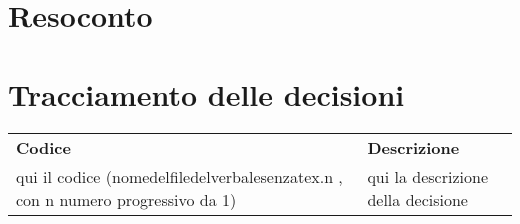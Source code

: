 \documentclass{article}
\begin{document}
\section{Resoconto}%
\label{resoconto}
\paragraph*{}

\section{Tracciamento delle decisioni}
\begin{table}[H]
  \centering
  \begin{tabular}{p{4cm}|p{12cm}}
    \rowcolor{lightgray}
    \textbf{Codice}  & \textbf{Descrizione}      \\
    qui il codice (nomedelfiledelverbalesenzatex.n , con n numero progressivo da 1)    & qui la descrizione della decisione \\
  \end{tabular}
\end{table}
\end{document}
